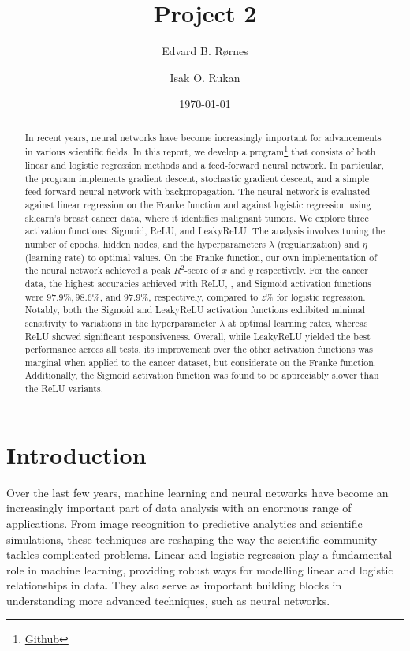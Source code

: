 \documentclass[%
reprint,s
amsmath,amssymb,
aps,
]{revtex4-2}
\begin{document}
	
\title{Project 2}
\author{Edvard B. Rørnes}
\author{Isak O. Rukan}
\date{\today}

\begin{abstract}
	In recent years, neural networks have become increasingly important for advancements in various scientific fields. In this report, we develop a program\footnote{\href{https://github.com/EdvardRornes/FYS-STK4155/tree/main/Project1}{Github}} that consists of both linear and logistic regression methods and a feed-forward neural network. In particular, the program implements gradient descent, stochastic gradient descent, and a simple feed-forward neural network with backpropagation. The neural network is evaluated against linear regression on the Franke function and against logistic regression using sklearn's breast cancer data, where it identifies malignant tumors. We explore three activation functions: Sigmoid, ReLU, and LeakyReLU. The analysis involves tuning the number of epochs, hidden nodes, and the hyperparameters $\lambda$ (regularization) and $\eta$ (learning rate) to optimal values. On the Franke function, our own implementation of the neural network achieved a peak $R^2$-score of $x$ and $y$ respectively. For the cancer data, the highest accuracies achieved with ReLU, , and Sigmoid activation functions were $97.9\%, 98.6\%$, and $97.9\%$, respectively, compared to $z\%$ for logistic regression. Notably, both the Sigmoid and LeakyReLU activation functions exhibited minimal sensitivity to variations in the hyperparameter $\lambda$ at optimal learning rates, whereas ReLU showed significant responsiveness. Overall, while LeakyReLU yielded the best performance across all tests, its improvement over the other activation functions was marginal when applied to the cancer dataset, but considerate on the Franke function. Additionally, the Sigmoid activation function was found to be appreciably slower than the ReLU variants.
\end{abstract}

\maketitle

\section{Introduction}
Over the last few years, machine learning and neural networks have become an increasingly important part of data analysis with an enormous range of applications. From image recognition to predictive analytics and scientific simulations, these techniques are reshaping the way the scientific community tackles complicated problems. Linear and logistic regression play a fundamental role in machine learning, providing robust ways for modelling linear and logistic relationships in data. They also serve as important building blocks in understanding more advanced techniques, such as neural networks. 
\end{document}
